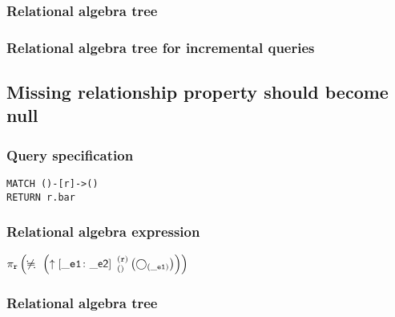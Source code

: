 \subsubsection*{Relational algebra tree}


\subsubsection*{Relational algebra tree for incremental queries}


\subsection{Missing relationship property should become null}

\subsubsection*{Query specification}

\begin{lstlisting}
MATCH ()-[r]->()
RETURN r.bar
\end{lstlisting}

\subsubsection*{Relational algebra expression}

$\projection{\var{r}} \left(\alldifferent{} \left(\expandout{\_e1}{\_e2}{}{r}{} \left(\getvertices{\_e1}{}\right)\right)\right)$

\subsubsection*{Relational algebra tree}

